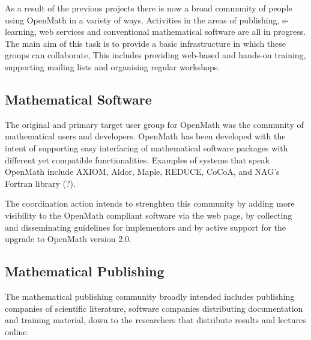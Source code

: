 \documentclass{euproposal}
\begin{document}



As a result of the previous projects there is now a broad community of
people using OpenMath in a variety of ways.  Activities in the areas
of publishing, e-learning, web services and conventional mathematical
software are all in progress.  The main aim of this task is to provide
a basic infrastructure in which these groups can collaborate, This
includes providing web-based and hands-on training, supporting mailing
lists and organising regular workshops.

\subsection{Mathematical Software}
\label{sec:msw}

The original and primary target user group for OpenMath was the
community of mathematical users and developers. OpenMath has been
developed with the intent of supporting easy interfacing of
mathematical software packages with different yet compatible
functionalities. Examples of systems that speak OpenMath include
AXIOM, Aldor, Maple, REDUCE, CoCoA, and NAG's Fortran library (?).

The coordination action intends to strenghten this community by adding
more visibility to the OpenMath compliant software via the web page,
by collecting and disseminating guidelines for implementors and by
active support for the upgrade to OpenMath version 2.0.

\subsection{Mathematical Publishing}
\label{sec:mpubl}

The mathematical publishing community broadly intended includes
publishing companies of scientific literature, software companies
distributing documentation and training material, down to the
researchers that distribute results and lectures online.
\end{document}

